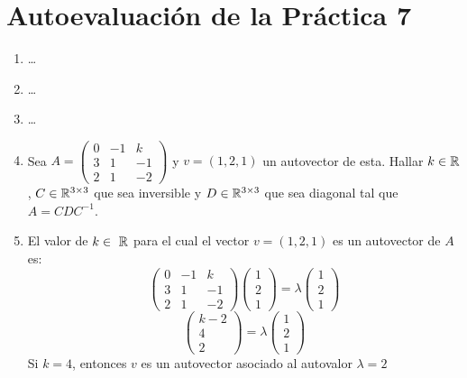 \documentclass[../practica.root.tex]{subfiles}
\begin{document}
\section{Autoevaluación de la Práctica 7}

\begin{enumerate}
    \item[] \dots
    \item   \dots
    \item   \dots
    \item[] Sea \( A = \begin{pmatrix}
              0 & -1 & k  \\
              3 & 1  & -1 \\
              2 & 1  & -2
          \end{pmatrix} \) y \( v = (1,2,1) \) un autovector de esta. Hallar \( k \in \R \), \( C \in \mathbb{R}^{3\times3} \) que sea inversible y \( D \in \mathbb{R}^{3\times3} \) que sea diagonal tal que \( A = CDC^{-1} \).
    \item   El valor de \( k \in \R \) para el cual el vector \( v = (1,2,1) \) es un autovector de \( A \) es:
          \[
              \begin{pmatrix}
                  0 & -1 & k  \\
                  3 & 1  & -1 \\
                  2 & 1  & -2
              \end{pmatrix}
              \begin{pmatrix}
                  1 \\ 2 \\ 1
              \end{pmatrix}
              =
              \lambda
              \begin{pmatrix}
                  1 \\ 2 \\ 1
              \end{pmatrix}
          \] \[
              \begin{pmatrix}
                  k - 2 \\ 4 \\ 2
              \end{pmatrix}
              =
              \lambda
              \begin{pmatrix}
                  1 \\ 2 \\ 1
              \end{pmatrix}
          \]
          Si \( k = 4 \), entonces \( v \) es un autovector asociado al autovalor \( \lambda = 2 \)

\end{enumerate}
\end{document}

